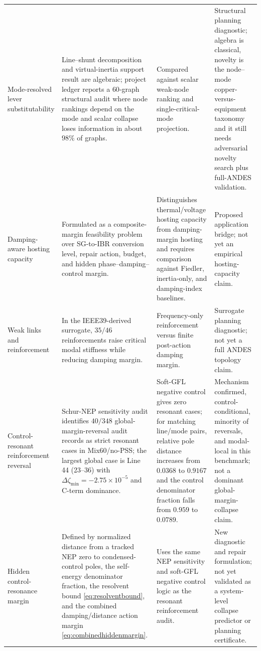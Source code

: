 \documentclass[journal]{IEEEtran}
\begin{document}
\begin{table}[t]
\begin{tabular}{@{}p{}p{}p{}p{}@{}}
Mode-resolved lever substitutability
& Line--shunt decomposition and virtual-inertia support result are algebraic; project ledger reports a $60$-graph structural audit where node rankings depend on the mode and scalar collapse loses information in about $98\%$ of graphs.
& Compared against scalar weak-node ranking and single-critical-mode projection.
& Structural planning diagnostic; algebra is classical, novelty is the node--mode copper-versus-equipment taxonomy and it still needs adversarial novelty search plus full-ANDES validation.\\
Damping-aware hosting capacity
& Formulated as a composite-margin feasibility problem over SG-to-IBR conversion level, repair action, budget, and hidden phase--damping--control margin.
& Distinguishes thermal/voltage hosting capacity from damping-margin hosting and requires comparison against Fiedler, inertia-only, and damping-index baselines.
& Proposed application bridge; not yet an empirical hosting-capacity claim.\\
Weak links and reinforcement
& In the IEEE39-derived surrogate, $35/46$ reinforcements raise critical modal stiffness while reducing damping margin.
& Frequency-only reinforcement versus finite post-action damping margin.
& Surrogate planning diagnostic; not yet a full ANDES topology claim.\\
Control-resonant reinforcement reversal
& Schur-NEP sensitivity audit identifies $40/348$ global-margin-reversal audit records as strict resonant cases in Mix60/no-PSS; the largest global case is Line 44 (23--36) with $\Delta\zeta_{\min}=-2.75{\times}10^{-5}$ and C-term dominance.
& Soft-GFL negative control gives zero resonant cases; for matching line/mode pairs, relative pole distance increases from $0.0368$ to $0.9167$ and the control denominator fraction falls from $0.959$ to $0.0789$.
& Mechanism confirmed, control-conditional, minority of reversals, and modal-local in this benchmark; not a dominant global-margin-collapse claim.\\
Hidden control-resonance margin
& Defined by normalized distance from a tracked NEP zero to condensed-control poles, the self-energy denominator fraction, the resolvent bound \eqref{eq:resolventbound}, and the combined damping/distance action margin \eqref{eq:combinedhiddenmargin}.
& Uses the same NEP sensitivity and soft-GFL negative control logic as the resonant reinforcement audit.
& New diagnostic and repair formulation; not yet validated as a system-level collapse predictor or planning certificate.\\

\end{tabular}
\end{table}
\end{document}
